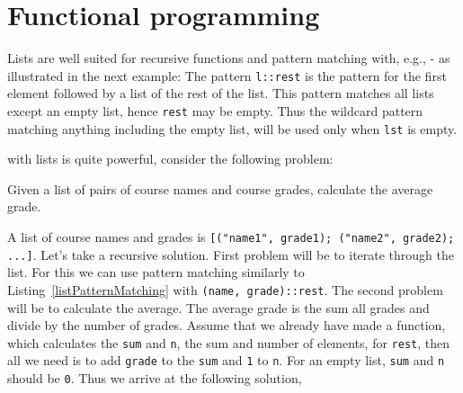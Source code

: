 \documentclass[fsharpnotes.tex]{subfiles}
\begin{document}
\chapter{Functional programming}
\label{chap:functional}

Lists are well suited for recursive functions and pattern matching with, e.g., - as illustrated in the next example:
%
%
The pattern \lstinline!l::rest! is the pattern for the first element followed by a list of the rest of the list. This pattern matches all lists except an empty list, hence \lstinline!rest! may be empty. Thus the wildcard pattern matching anything including the empty list, will be used only when \lstinline!lst! is empty.

 with lists is quite powerful, consider the following problem:
\begin{problem}
  Given a list of pairs of course names and course grades, calculate the average grade.
\end{problem}
A list of course names and grades is \lstinline![("name1", grade1); ("name2", grade2); ...]!. Let's take a recursive solution. First problem will be to iterate through the list. For this we can use pattern matching similarly to Listing~\ref{listPatternMatching} with \lstinline!(name, grade)::rest!. The second problem will be to calculate the average. The average grade is the sum all grades and divide by the number of grades. Assume that we already have made a function, which calculates the \lstinline!sum! and \lstinline!n!, the sum and number of elements, for \lstinline!rest!, then all we need is to add \lstinline!grade! to the \lstinline!sum! and \lstinline!1! to \lstinline!n!. For an empty list, \lstinline!sum! and \lstinline!n! should be \lstinline!0!. Thus we arrive at the following solution,
%
%
\end{document}
